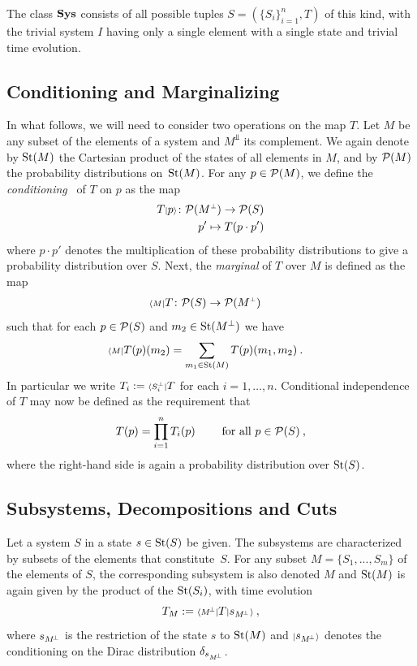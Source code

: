 The class $\mathbf{Sys}$ consists of all possible tuples $S= (\{S_i\}^n_{i=1}, T)$ of this kind, with the trivial system $I$ having only a single element with a single state and trivial time evolution.

\subsection{Conditioning and Marginalizing}
In what follows, we will need to consider two operations on the map $T$. Let $M$ be any subset of the elements of a system and $M^\Bot$ its complement. We again denote by $\text{St}(M)$ the Cartesian product of the states of all elements in $M$, and by
$\mathcal P(M)$ the probability distributions on~$\text{St}(M)$.
For any $p \in \mathcal P(M)$, we define the {\em conditioning}~\cite{mayner2018pyphi} of $T$ on $p$ as the map
\begin{align}\begin{split}\label{eq:Cond}
T{\scriptstyle |}p{\scriptstyle \rangle} \colon \mathcal P(M^{{\scriptscriptstyle \bot}}) \rightarrow \mathcal P(S) \\
p' \mapsto  T(p \cdot p') 
\end{split}\end{align}
where $p \cdot p'$ denotes the multiplication of these probability distributions to give a probability distribution over $S$. 
Next, the {\em marginal} of $T$ over $M$ is defined as the map 
\begin{align}\label{eq:marg-simple}
{\scriptstyle \langle M |}T \colon \mathcal P(S) &\rightarrow  \mathcal P(M^{\scriptscriptstyle \bot})
\end{align}
such that for each $p \in \mathcal P(S)$ and $m_2 \in \text{St}(M^\bot)$ we have
\begin{align}
{\scriptstyle \langle M |}T(p)(m_2) &= \sum_{m_1 \in \text{St}(M)} T(p)(m_1,m_2) \:.
\end{align}
In particular we write $T_i := {\scriptstyle \langle S_i^\bot |} T$ for each $i=1,\dots,n$. Conditional independence of $T$ may now be defined as the requirement that 
\[
T(p) = \prod^n_{i=1} T_i(p) \qquad \textrm{ for all } p \in \mathcal P(S) \:,
\]
where the right-hand side is again a probability distribution over $\text{St}(S)$.



\subsection{Subsystems, Decompositions and Cuts}\label{sec:ClassicalSysData}
Let a system $S$ in a state $s \in \text{St}(S)$ be given. The subsystems are characterized by subsets of the elements that constitute~$S$.
For any subset $M = \{S_1 , ... , S_m\}$ of the elements of $S$, the corresponding subsystem is also
 denoted $M$ and $\text{St}(M)$ is again given by the product of the $\text{St}(S_i)$, with time evolution 
\begin{equation}\label{eq:SubsysTPM}
T_{M} :={\scriptstyle \langle M^{\!\scriptscriptstyle \bot} |} T {\scriptstyle |}s_{M^{\!\scriptscriptstyle \bot}} {\scriptstyle \rangle} \:,
\end{equation}
where $s_{M^{\!\scriptscriptstyle \bot}}$ is the restriction of the state $s$ to $\text{St}(M)$ and ${\scriptstyle |}s_{M^{\!\scriptscriptstyle \bot}} {\scriptstyle \rangle}$ denotes the conditioning on the Dirac distribution $\delta_{s_{M^{\!\scriptscriptstyle \bot}}}$.

